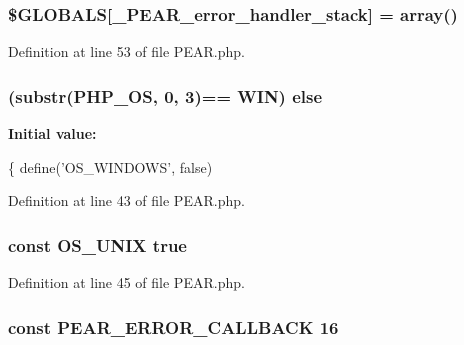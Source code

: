 \subsubsection[{\texorpdfstring{\$\+G\+L\+O\+B\+A\+LS}{$GLOBALS}}]{\setlength{\rightskip}{0pt plus 5cm}\$G\+L\+O\+B\+A\+LS\mbox{[}\textquotesingle{}\+\_\+\+P\+E\+A\+R\+\_\+error\+\_\+handler\+\_\+stack\textquotesingle{}\mbox{]} = array()}\hypertarget{PEAR_8php_ae888e544d830e6c8570cd51fd614de27}{}\label{PEAR_8php_ae888e544d830e6c8570cd51fd614de27}


Definition at line 53 of file P\+E\+A\+R.\+php.

\subsubsection[{\texorpdfstring{else}{else}}]{ (substr(P\+H\+P\+\_\+\+OS, 0, 3)== \textquotesingle{}W\+IN\textquotesingle{}) else}\hypertarget{PEAR_8php_aa8a49739e8eb898476e14127c4cd0a49}{}\label{PEAR_8php_aa8a49739e8eb898476e14127c4cd0a49}
{\bfseries Initial value\+:}
\begin{DoxyCode}
\{
    define(\textcolor{stringliteral}{'OS\_WINDOWS'}, \textcolor{keyword}{false})
\end{DoxyCode}


Definition at line 43 of file P\+E\+A\+R.\+php.

\subsubsection[{\texorpdfstring{O\+S\+\_\+\+U\+N\+IX}{OS_UNIX}}]{\setlength{\rightskip}{0pt plus 5cm}const O\+S\+\_\+\+U\+N\+IX true}\hypertarget{PEAR_8php_aac9eed8b1212799624da961df2b7469f}{}\label{PEAR_8php_aac9eed8b1212799624da961df2b7469f}


Definition at line 45 of file P\+E\+A\+R.\+php.

\subsubsection[{\texorpdfstring{P\+E\+A\+R\+\_\+\+E\+R\+R\+O\+R\+\_\+\+C\+A\+L\+L\+B\+A\+CK}{PEAR_ERROR_CALLBACK}}]{\setlength{\rightskip}{0pt plus 5cm}const P\+E\+A\+R\+\_\+\+E\+R\+R\+O\+R\+\_\+\+C\+A\+L\+L\+B\+A\+CK 16}\hypertarget{PEAR_8php_ad1780c583741d97d9a2b3077516744af}{}\label{PEAR_8php_ad1780c583741d97d9a2b3077516744af}


